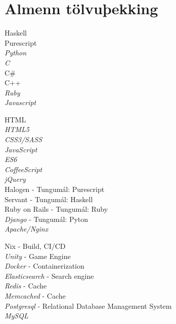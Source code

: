 \documentclass[10pt]{article} %
\begin{document}
\section{Almenn tölvuþekking}

{
Haskell\\
Purescript\\
\textit{Python}\\
\textit{C}\\
C\#\\
C++\\
\textit{Ruby}\\
\textit{Javascript}
}


{
HTML\\
\textit{HTML5\\
CSS3/SASS\\
JavaScript\\
ES6\\
CoffeeScript\\
jQuery}\\
Halogen       - Tungumál: Purescript\\
Servant       - Tungumál: Haskell\\
Ruby on Rails - Tungumál: Ruby\\
\textit{Django}        - Tungumál: Pyton\\
\textit{Apache/Nginx}}

{
Nix           - Build, CI/CD\\
\textit{Unity}         - Game Engine\\
\textit{Docker}        - Containerization \\
\textit{Elasticsearch} - Search engine\\
\textit{Redis}         - Cache\\
\textit{Memcached}     - Cache\\
\textit{Postgresql}    - Relational Database Management System\\
\textit{MySQL}}
\end{document}

